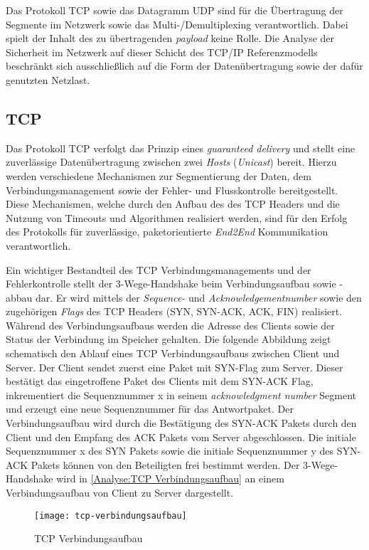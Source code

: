 Das Protokoll \ac{TCP} sowie das Datagramm \ac{UDP} sind für die Übertragung der Segmente im Netzwerk sowie das Multi-/Demultiplexing verantwortlich. Dabei spielt der Inhalt des zu übertragenden \textit{payload} keine Rolle. Die Analyse der Sicherheit im Netzwerk auf dieser Schicht des \ac{TCP}/\ac{IP} Referenzmodells beschränkt sich ausschließlich auf die Form der Datenübertragung sowie der dafür genutzten Netzlast.

\subsection{\ac{TCP}}
\label{Analyse:TCP}
Das Protokoll \ac{TCP} verfolgt das Prinzip eines \textit{guaranteed delivery} und stellt eine zuverlässige Datenübertragung zwischen zwei \textit{Hosts} (\textit{Unicast}) bereit. Hierzu werden verschiedene Mechanismen zur Segmentierung der Daten, dem Verbindungsmanagement sowie der Fehler- und Flusskontrolle bereitgestellt. Diese Mechanismen, welche durch den Aufbau des des \ac{TCP} Headers und die Nutzung von Timeouts und Algorithmen realisiert werden, sind für den Erfolg des Protokolls für zuverlässige, paketorientierte \textit{End2End} Kommunikation verantwortlich.

Ein wichtiger Bestandteil des \ac{TCP} Verbindungsmanagements und der Fehlerkontrolle stellt der 3-Wege-Handshake beim Verbindungsaufbau sowie -abbau dar. Er wird mittels der \textit{Sequence-} und \textit{Acknowledgementnumber} sowie den zugehörigen \textit{Flags} des \ac{TCP} Headers (\ac{SYN}, \ac{SYN-ACK}, \ac{ACK}, \ac{FIN}) realisiert. Während des Verbindungsaufbaus werden die Adresse des Clients sowie der Status der Verbindung im Speicher gehalten. Die folgende Abbildung zeigt schematisch den Ablauf eines \ac{TCP} Verbindungsaufbaus zwischen Client und Server. Der Client sendet zuerst eine Paket mit SYN-Flag zum Server. Dieser bestätigt das eingetroffene Paket des Clients mit dem SYN-ACK Flag, inkrementiert die Sequenznummer x in seinem \textit{acknowledgment number} Segment und erzeugt eine neue Sequenznummer für das Antwortpaket. Der Verbindungsaufbau wird durch die Bestätigung des SYN-ACK Pakets durch den Client und den Empfang des ACK Pakets vom Server abgeschlossen. Die initiale Sequenznummer x des SYN Pakets sowie die initiale Sequenznummer y des SYN-ACK Pakets können von den Beteiligten frei bestimmt werden. Der 3-Wege-Handshake wird in \autoref{Analyse:TCP Verbindungsaufbau} an einem Verbindungsaufbau von Client zu Server dargestellt.

\begin{figure}[h]
    \centering
    \texttt{[image: tcp-verbindungsaufbau]}
    \caption{TCP Verbindungsaufbau}
    \label{Analyse:TCP Verbindungsaufbau}
\end{figure}

